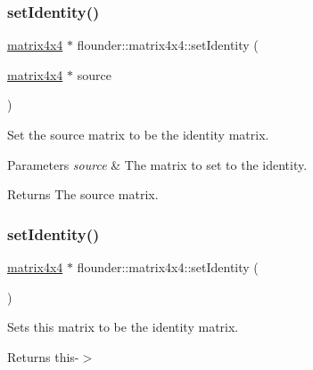 \subsubsection{\texorpdfstring{set\+Identity()}{setIdentity()}\hspace{0.1cm}{\footnotesize\ttfamily [1/2]}}
{\footnotesize\ttfamily \hyperlink{classflounder_1_1matrix4x4}{matrix4x4} $\ast$ flounder\+::matrix4x4\+::set\+Identity (\begin{DoxyParamCaption}\item[{\hyperlink{classflounder_1_1matrix4x4}{matrix4x4} $\ast$}]{source }\end{DoxyParamCaption})\hspace{0.3cm}{\ttfamily [static]}}



Set the source matrix to be the identity matrix. 


\begin{DoxyParams}{Parameters}
{\em source} & The matrix to set to the identity. \\
\hline
\end{DoxyParams}
\begin{DoxyReturn}{Returns}
The source matrix. 
\end{DoxyReturn}
\mbox{\label{classflounder_1_1matrix4x4_a973b7975291890e5697255c95f4a252f}} 
\subsubsection{\texorpdfstring{set\+Identity()}{setIdentity()}\hspace{0.1cm}{\footnotesize\ttfamily [2/2]}}
{\footnotesize\ttfamily \hyperlink{classflounder_1_1matrix4x4}{matrix4x4} $\ast$ flounder\+::matrix4x4\+::set\+Identity (\begin{DoxyParamCaption}{ }\end{DoxyParamCaption})}



Sets this matrix to be the identity matrix. 

\begin{DoxyReturn}{Returns}
this-\/$>$ 
\end{DoxyReturn}
\mbox{\label{classflounder_1_1matrix4x4_ab9f73c85d8b8844435858aafbf99d5d7}} 
